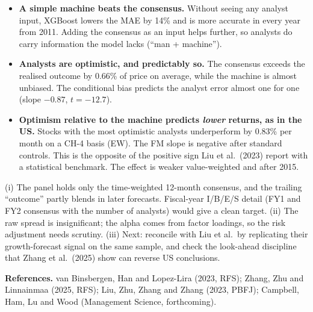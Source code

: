 \begin{itemize}
\item \textbf{A simple machine beats the consensus.} Without seeing any analyst input, XGBoost lowers the MAE by
  14\% and is more accurate in every year from 2011. Adding the consensus as an input helps further, so analysts do
  carry information the model lacks (``man + machine'').
\item \textbf{Analysts are optimistic, and predictably so.} The consensus exceeds the realised outcome by 0.66\% of
  price on average, while the machine is almost unbiased. The conditional bias predicts the analyst error almost
  one for one (slope $-0.87$, $t=-12.7$).
\item \textbf{Optimism relative to the machine predicts \emph{lower} returns, as in the US.} Stocks with the most
  optimistic analysts underperform by 0.83\% per month on a CH-4 basis (EW). The FM slope is negative after
  standard controls. This is the opposite of the positive sign Liu et al.\ (2023) report with a statistical
  benchmark. The effect is weaker value-weighted and after 2015.
\end{itemize}

(i) The panel holds only the time-weighted 12-month consensus, and the trailing ``outcome'' partly blends in later
forecasts. Fiscal-year I/B/E/S detail (FY1 and FY2 consensus with the number of analysts) would give a clean
target. (ii) The raw spread is insignificant; the alpha comes from factor loadings, so the risk adjustment needs
scrutiny. (iii) Next: reconcile with Liu et al.\ by replicating their growth-forecast signal on the same sample,
and check the look-ahead discipline that Zhang et al.\ (2025) show can reverse US conclusions.

{\footnotesize \textbf{References.} van Binsbergen, Han and Lopez-Lira (2023, RFS); Zhang, Zhu and
Linnainmaa (2025, RFS); Liu, Zhu, Zhang and Zhang (2023, PBFJ); Campbell, Ham, Lu and Wood (Management Science,
forthcoming).}

